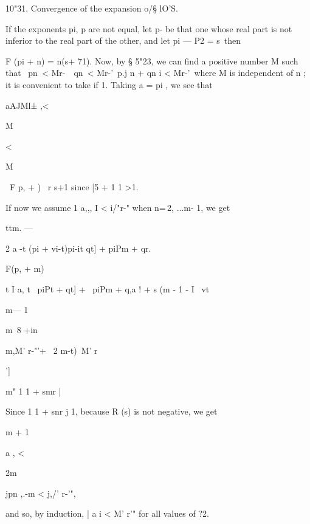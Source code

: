 10"31. Convergence of the expansion o/§ lO'S. 

If the exponents pi, p  are not equal, let p-  be that one whose real part is 
not inferior to the real part of the other, and let pi — P2 = s\ then 

F (pi + n) = n(s+ 71). 
Now, by § 5"23, we can find a positive number M such that 
\ pn\ <  Mr-\ \ qn\ <  Mr-'\ p.j n + qn i < Mr-'\ 
where M is independent of n ; it is convenient to take if   1. 
Taking a = pi , we see that 



aAJMl± ,< 



M 



< 



M 



\ F p, +  ) \ r s+1 
since |5 + 1 1 >1. 

If now we assume 1 a,,, I < i/"r-" when n=\,2, ...m- 1, we get 



ttm. — 



2 a -t  (pi + vi-t)pi-it qt] + piPm + qr. 



F(p, + m) 

t I a, t  \ piPt + qt] + \ piPm + q,a ! + s (m - 1    -  I \ vt 






m— 1 



m\ 8 +in\ 



m,M' r-"'+ \ 2  m-t)\ M' r 



'] 



m" 1 1 + smr  | 

Since 1 1 + snr  j   1, because R (s) is not negative, we get 

m + 1 



a , < 



2m 



jpn ,.-m < j,/' r-'", 



and so, by induction, | a  i < M' r'"  for all values of ?2. 

